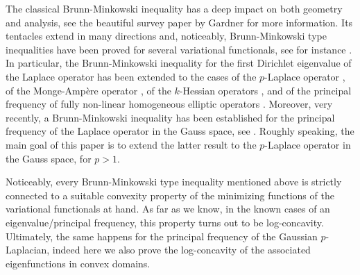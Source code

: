 \documentclass[12pt]{amsart}
\newcommand{\1}{\mathbf 1}
\begin{document}
The classical Brunn-Minkowski inequality has a deep impact on both geometry and analysis, see the beautiful survey paper by Gardner \cite{Gardner2002} for more information. Its tentacles extend in many directions and, noticeably, Brunn-Minkowski type inequalities have been proved for several variational functionals, see for instance \cite{Borell1, Borell3, Brascamp-Lieb1976, Colesanti, Colesanti-Salani}.
In particular, the Brunn-Minkowski inequality for the first Dirichlet eigenvalue of the Laplace operator \cite{Brascamp-Lieb1976} has been extended to the cases of the $p$-Laplace operator \cite{Andrea-Cuoghi-Salani2006}, of the Monge-Amp\`ere operator \cite{Salani2005}, of the $k$-Hessian operators \cite{LiuMaXu, Salani2012}, and of the principal frequency of fully non-linear homogeneous elliptic operators \cite{Crasta-Fragal2020}.
Moreover, very recently, a Brunn-Minkowski inequality has been established for the principal frequency of the Laplace operator in the Gauss space, see  \cite{Andrea-Paolo2024}.
Roughly speaking, the main goal of this paper is to extend the latter result to the $p$-Laplace operator in the Gauss space, for $p>1$.

Noticeably, every Brunn-Minkowski type inequality mentioned above is strictly connected to a suitable convexity property of the minimizing functions of the variational functionals at hand. As far as we know, in the known cases of an eigenvalue/principal frequency, this property turns out to be log-concavity. Ultimately, the same happens for the principal frequency of the Gaussian $p$-Laplacian, indeed here we also prove the log-concavity of the associated eigenfunctions in convex domains.

\end{document}
